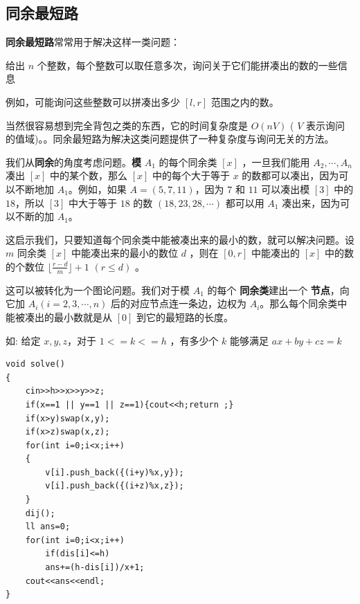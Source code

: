 \documentclass[12pt, a4paper, oneside]{ctexart}
\begin{document}
\flushleft
\newpage
\subsection{同余最短路} 
\textbf{同余最短路}常常用于解决这样一类问题：\par
 给出 $n$ 个整数，每个整数可以取任意多次，询问关于它们能拼凑出的数的一些信息\par
\par \hspace*{\fill} \par
例如，可能询问这些整数可以拼凑出多少 $[l,r]$  范围之内的数。\par
\par \hspace*{\fill} \par
当然很容易想到完全背包之类的东西，它的时间复杂度是 $O(nV)$ ( $V$ 表示询问的值域)。。同余最短路为解决这类问题提供了一种复杂度与询问无关的方法。\par
\par \hspace*{\fill} \par
我们从\textbf{同余}的角度考虑问题。\textbf{模} $A_1$ 的每个同余类 $[x]$ ，一旦我们能用 $A_2,\cdots,A_n$ 凑出 $[x]$ 中的某个数，那么 $[x]$ 中的每个大于等于 $x$ 的数都可以凑出，因为可以不断地加 $A_1$。例如，如果 $A=(5,7,11)$，因为 $7$ 和 $11$ 可以凑出模 $[3]$ 中的 $18$，所以 $[3]$ 中大于等于 $18$ 的数 $(18,23,28,\cdots )$ 都可以用 $A_1$ 凑出来，因为可以不断的加 $A_1$。\par
\par \hspace*{\fill} \par
这启示我们，只要知道每个同余类中能被凑出来的最小的数，就可以解决问题。设 $m$ 同余类 $[x]$ 中能凑出来的最小的数位 $d$ ，则在 $[0,r]$ 中能凑出的 $[x]$ 中的数的个数位 $\lfloor \frac{r-d}{m} \rfloor+1$ $(r \leq d)$ 。  \par
\par \hspace*{\fill} \par
这可以被转化为一个图论问题。我们对于模 $A_1$ 的每个 \textbf{同余类}建出一个 \textbf{节点}，向它加 $A_i(i=2,3,\cdots , n)$ 后的对应节点连一条边，边权为 $A_i$。那么每个同余类中能被凑出的最小数就是从 $[0]$ 到它的最短路的长度。
\par \hspace*{\fill} \par
如: 给定 $x,y,z$，对于 $ 1<= k <= h$ ，有多少个 $k$ 能够满足 $ax+by+cz=k$
\begin{lstlisting}
void solve()
{
	cin>>h>>x>>y>>z;
	if(x==1 || y==1 || z==1){cout<<h;return ;}
	if(x>y)swap(x,y);
	if(x>z)swap(x,z);
	for(int i=0;i<x;i++)
	{
		v[i].push_back({(i+y)%x,y});
		v[i].push_back({(i+z)%x,z});
	}
	dij();
	ll ans=0;
	for(int i=0;i<x;i++)
		if(dis[i]<=h)
		ans+=(h-dis[i])/x+1;
	cout<<ans<<endl;
}
\end{lstlisting}
\end{document}
